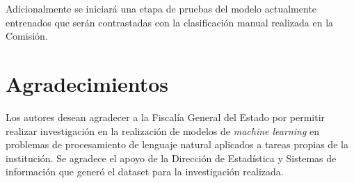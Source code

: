 \documentclass[onecolumn, journal, english, 12pt, a4paper]{IEEEtran} %
\theoremstyle{definition}
\begin{document}
Adicionalmente se iniciará una etapa de pruebas del modelo actualmente entrenados que serán contrastadas con la clasificación manual realizada en la Comisión.



%





\section*{Agradecimientos}


Los autores desean agradecer a la Fiscalía General del Estado por permitir realizar investigación en la realización de modelos de \emph{machine learning} en problemas de procesamiento de lenguaje natural aplicados a tareas propias de la institución. Se agradece el apoyo de la Dirección de Estadística y Sistemas de información que generó el dataset para la investigación realizada. 
\end{document}
